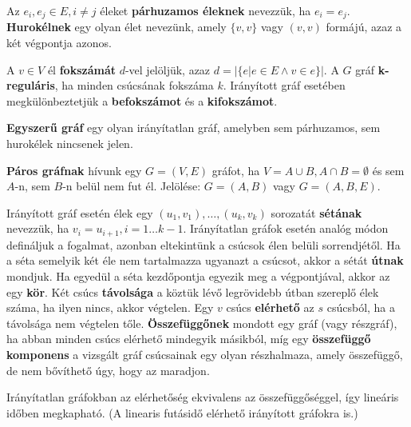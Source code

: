\begin{definition}
Az $e_i, e_j \in E, i \neq j$ éleket \textbf{párhuzamos éleknek} nevezzük, ha $e_i=e_j$. \textbf{Hurokélnek} egy olyan élet nevezünk, amely $\{v, v\}$ vagy $(v, v)$ formájú, azaz a két végpontja azonos.
\end{definition}

\begin{definition}
A $v \in V$ él \textbf{fokszámát} $d$-vel jelöljük, azaz $d=| \{ e | e \in E \land v \in e \}|$. A $G$ gráf \textbf{k-reguláris}, ha minden csúcsának fokszáma $k$. Irányított gráf esetében megkülönbeztetjük a \textbf{befokszámot} és a \textbf{kifokszámot}.
\end{definition}

\begin{definition}
\textbf{Egyszerű gráf} egy olyan irányítatlan gráf, amelyben sem párhuzamos, sem hurokélek nincsenek jelen.
\end{definition}

\begin{definition}
\textbf{Páros gráfnak} hívunk egy $G=(V,E)$ gráfot, ha $V=A \cup B, A \cap B = \emptyset$ és sem $A$-n, sem $B$-n belül nem fut él. Jelölése: $G=(A,B)$ vagy $G=(A,B,E)$.
\end{definition}

\begin{definition}
Irányított gráf esetén élek egy $(u_1, v_1), \ldots, (u_k, v_k)$ sorozatát \textbf{sétának} nevezzük, ha $v_i=u_{i+1}, i=1 \ldots k-1$. Irányítatlan gráfok esetén analóg módon defináljuk a fogalmat, azonban eltekintünk a csúcsok élen belüli sorrendjétől. Ha a séta semelyik két éle nem tartalmazza ugyanazt a csúcsot, akkor a sétát \textbf{útnak} mondjuk. Ha egyedül a séta kezdőpontja egyezik meg a végpontjával, akkor az egy \textbf{kör}. Két csúcs \textbf{távolsága} a köztük lévő legrövidebb útban szereplő élek száma, ha ilyen nincs, akkor végtelen. Egy $v$ csúcs \textbf{elérhető} az $s$ csúcsból, ha a távolsága nem végtelen tőle. \textbf{Összefüggőnek} mondott egy gráf (vagy részgráf), ha abban minden csúcs elérhető mindegyik másikból, míg egy \textbf{összefüggő komponens} a vizsgált gráf csúcsainak egy olyan részhalmaza, amely összefüggő, de nem bővíthető úgy, hogy az maradjon.
\end{definition}

\begin{note}
Irányítatlan gráfokban az elérhetőség ekvivalens az összefüggőséggel, így lineáris időben megkapható. (A linearis futásidő elérhető irányított gráfokra is.)
\end{note}

